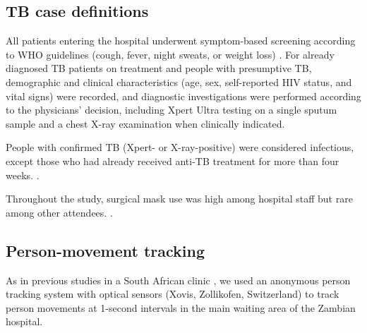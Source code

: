 \documentclass[11pt]{article}
\begin{document}
\subsection{TB case definitions}\label{tb-case-definitions}

All patients entering the hospital underwent symptom-based screening according to WHO guidelines (cough, fever, night sweats, or weight loss) \cite{worldhealthorganization2014}. For already diagnosed TB patients on treatment and people with presumptive TB, demographic and clinical characteristics (age, sex, self-reported HIV status, and vital signs) were recorded, and diagnostic investigations were performed according to the physicians' decision, including Xpert Ultra testing on a single sputum sample and a chest X-ray examination when clinically indicated. 

People with confirmed TB (Xpert- or X-ray-positive) were considered infectious, except those who had already received anti-TB treatment for more than four weeks.  \cite{dinkele2024iScience,patterson2024ProcNatlAcadSci}.\label{chg:R2.10} 

Throughout the study, surgical mask use was high among hospital staff but rare among other attendees. .\label{chg:R2.33}

\subsection{Person-movement tracking}\label{person-movement-tracking}

As in previous studies in a South African clinic \cite{banholzer2025PLOSComputBiol,zurcher2022JInfectDis}, we used an anonymous person tracking system with optical sensors (Xovis, Zollikofen, Switzerland) to track person movements at 1-second intervals in the main waiting area of the Zambian hospital. \label{chg:R2.2} 
\end{document}
